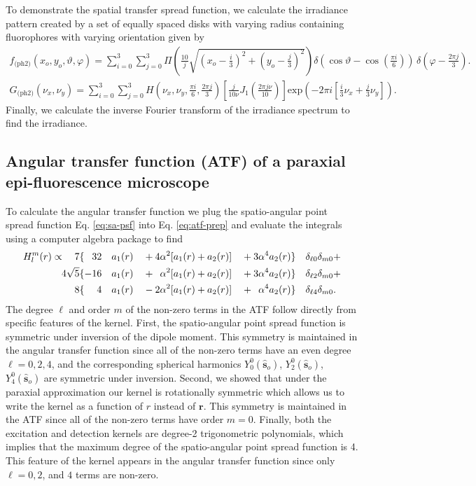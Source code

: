 \documentclass[]{osa-article}
\providecommand{\mb}[1]{\mathbf{#1}}
\providecommand{\so}{\mathbf{\hat{s}}_o}
\begin{document}
 To demonstrate the spatial transfer spread function, we calculate the
 irradiance pattern created by a set of equally spaced disks with varying radius
 containing fluorophores with varying orientation given by
 \begin{align}
   f_{\text{(ph2)}}(x_o, y_o, \vartheta, \varphi) = \sum_{i=0}^3 \sum_{j=0}^3 \Pi\left(\frac{10}{j}\sqrt{\left(x_o - \frac{i}{3}\right)^2 + \left(y_o - \frac{j}{3}\right)^2}\right) \delta\left(\cos\vartheta - \cos\left(\frac{\pi i}{6}\right)\right)\, \delta\left(\varphi - \frac{2\pi j}{3}\right).\label{eq:phantom2}
 \end{align}
 \begin{align}
   G_{\text{(ph2)}}(\nu_x, \nu_y) = \sum_{i=0}^3 \sum_{j=0}^3 H\left(\nu_x, \nu_y, \frac{\pi i}{6}, \frac{2\pi j}{3}\right)\left[\frac{j}{10\nu}J_1\left(\frac{2\pi j\nu}{10}\right)\right]\text{exp}\left(-2\pi i\left[\frac{i}{3}\nu_x + \frac{j}{3}\nu_y\right]\right).\label{eq:phantom2g}
 \end{align}
 Finally, we calculate the inverse Fourier transform of the irradiance spectrum
 to find the irradiance. 
 
 \subsection{Angular transfer function (ATF) of a paraxial epi-fluorescence microscope}
To calculate the angular transfer function we plug the spatio-angular point
spread function Eq. \ref{eq:sa-psf} into Eq. \ref{eq:atf-prep} and evaluate the
integrals using a computer algebra package \cite{meurer2017} to find
\begin{alignat}{6}
  H_l^m(r) \propto \quad 7&\{\hphantom{-}32&&a_1(r)&& + 4\alpha^2[a_1(r) + a_2(r)]&&+ 3\alpha^4a_2(r)\}&&\delta_{\ell 0}\delta_{m0}+\nonumber\\
  4\sqrt{5}&\{-16&&a_1(r)&& + \hphantom{1}\alpha^2[a_1(r) + a_2(r)] &&+ 3\alpha^4a_2(r)\}&&\delta_{\ell 2}\delta_{m0} + \nonumber\\
  8&\{\hphantom{-1}4&&a_1(r)&& - 2\alpha^2[a_1(r) + a_2(r)] &&+ \hphantom{1}\alpha^4a_2(r)\}&&\delta_{\ell 4}\delta_{m0}.
\end{alignat}
The degree $\ell$ and order $m$ of the non-zero terms in the ATF follow directly
from specific features of the kernel. First, the spatio-angular point spread
function is symmetric under inversion of the dipole moment. This symmetry is
maintained in the angular transfer function since all of the non-zero terms have
an even degree $\ell=0, 2, 4$, and the corresponding spherical harmonics
$Y_0^0(\so)$, $Y_2^0(\so)$, $Y_4^0(\so)$ are symmetric under inversion. Second,
we showed that under the paraxial approximation our kernel is rotationally
symmetric which allows us to write the kernel as a function of $r$ instead of
$\mb{r}$. This symmetry is maintained in the ATF since all of the non-zero terms
have order $m=0$. Finally, both the excitation and detection kernels are
degree-2 trigonometric polynomials, which implies that the maximum degree of the
spatio-angular point spread function is 4. This feature of the kernel appears in
the angular transfer function since only $\ell=0, 2$, and $4$ terms are
non-zero.
\end{document}

